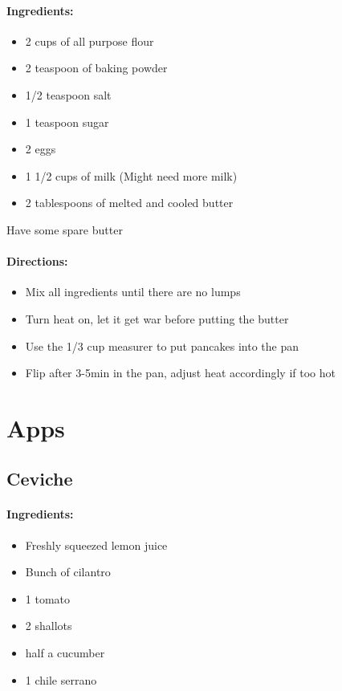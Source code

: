 \documentclass{article}
\begin{document}
\paragraph{Ingredients:}

\begin{itemize}
	\item 2 cups of all purpose flour 
	\item 2 teaspoon of baking powder 
	\item 1/2 teaspoon salt 
	\item 1 teaspoon sugar 
	\item 2 eggs 
	\item 1 1/2 cups of milk (Might need more milk)
	\item 2 tablespoons of melted and cooled butter
\end{itemize}

Have some spare butter

\paragraph{Directions:}
\begin{itemize}
	\item Mix all ingredients until there are no lumps 
	\item Turn heat on, let it get war before putting the butter 
	\item Use the 1/3 cup measurer to put pancakes into the pan 
	\item Flip after 3-5min in the pan, adjust heat accordingly if too hot
\end{itemize}

\section{Apps}

\subsection{Ceviche}

\paragraph{Ingredients:}

\begin{itemize}
	\item Freshly squeezed lemon juice
	\item Bunch of cilantro
	\item 1 tomato
	\item 2 shallots
	\item half a cucumber
	\item 1 chile serrano 
\end{itemize}
\end{document}
